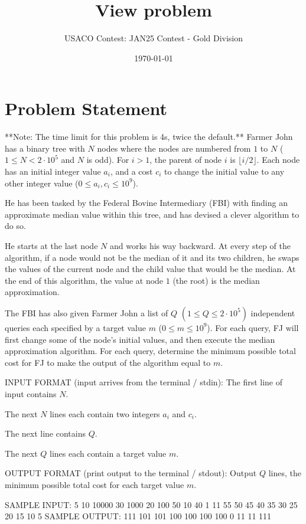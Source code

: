 \documentclass[12pt]{article}
\title{View problem}
\author{USACO Contest: JAN25 Contest - Gold Division}
\date{\today}
\begin{document}
\maketitle

\section*{Problem Statement}


**Note: The time limit for this problem is 4s, twice the default.**
Farmer John has a binary tree with $N$ nodes  where the nodes are numbered from
$1$ to $N$ ($1 \leq N < 2\cdot 10^5$ and $N$ is odd). For $i>1$, the parent of
node $i$  is $\lfloor i/2\rfloor$. Each node has an initial integer value $a_i$,
and a cost $c_i$ to change the initial value to any other integer value
($0\le a_i,c_i\le 10^9$).

He has been tasked by the Federal Bovine Intermediary (FBI) with finding an
approximate median value within this tree, and has devised a clever algorithm to
do so.

He starts at the last node $N$ and works his way backward. At every step of the
algorithm, if a node would not be the median of it and its two children, he
swaps the values of the current node and the child value that would be the
median. At the end of this algorithm, the value at node $1$ (the root) is the
median approximation.

The FBI has also given Farmer John a list of $Q$ $(1 \leq Q \leq 2\cdot 10^5)$
independent queries each specified by a target value $m$ ($0\le m\le 10^9$). For
each query, FJ will first change some of the node's initial values, and then
execute the median approximation algorithm. For each query, determine the
minimum possible total cost for FJ to make the output of the algorithm equal to
$m$.

INPUT FORMAT (input arrives from the terminal / stdin):
The first line of input contains $N$.

The next $N$ lines each contain two integers $a_i$ and $c_i$.

The next line contains $Q$.

The next $Q$ lines each contain a target value $m$.

OUTPUT FORMAT (print output to the terminal / stdout):
Output $Q$ lines, the minimum possible total cost for each target value $m$.

SAMPLE INPUT:
5
10 10000
30 1000
20 100
50 10
40 1
11
55
50
45
40
35
30
25
20
15
10
5
SAMPLE OUTPUT: 
111
101
101
100
100
100
100
0
11
11
111
\end{document}
